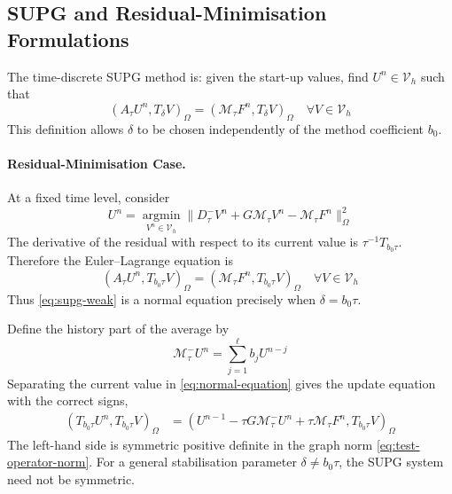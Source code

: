 \documentclass[11pt]{article}
\begin{document}

\subsection{SUPG and Residual-Minimisation Formulations}
\label{subsec:supg-residual-formulations}
The time-discrete SUPG method is: given the start-up values, find
\(U^n\in\mathcal V_h\) such that
\begin{equation}
(A_{\tau}U^n,T_{\delta}V)_{\Omega}
=(\mathcal M_{\tau}F^n,T_{\delta}V)_{\Omega}
\quad \forall V\in\mathcal V_h \label{eq:supg-weak}
\end{equation}
This definition allows \(\delta\) to be chosen independently of the method
coefficient \(b_0\).

\paragraph{Residual-Minimisation Case.}
At a fixed time level, consider
\begin{equation}
U^n=\operatorname*{argmin}_{V^n\in\mathcal V_h}
\|D_{\tau}^{-}V^n+G\mathcal M_{\tau}V^n
-\mathcal M_{\tau}F^n\|_{\Omega}^2 \label{eq:ls}
\end{equation}
The derivative of the residual with respect to its current value is
\(\tau^{-1}T_{b_0\tau}\). Therefore the Euler--Lagrange equation is
\begin{equation}
(A_{\tau}U^n,T_{b_0\tau}V)_{\Omega}
=(\mathcal M_{\tau}F^n,T_{b_0\tau}V)_{\Omega}
\quad \forall V\in\mathcal V_h \label{eq:normal-equation}
\end{equation}
Thus \eqref{eq:supg-weak} is a normal equation precisely when
\(\delta=b_0\tau\).

Define the history part of the average by
\begin{equation}
\mathcal M_{\tau}^{-}U^n=\sum_{j=1}^{\ell}b_jU^{n-j} \label{eq:history-average}
\end{equation}
Separating the current value in \eqref{eq:normal-equation} gives the update
equation with the correct signs,
\begin{align}
(T_{b_0\tau}U^n,T_{b_0\tau}V)_{\Omega}
&=(U^{n-1}-\tau G\mathcal M_{\tau}^{-}U^n
+\tau\mathcal M_{\tau}F^n,T_{b_0\tau}V)_{\Omega} \label{eq:normal-update-equation}
\end{align}
The left-hand side is symmetric positive definite in the graph norm
\eqref{eq:test-operator-norm}. For a general stabilisation parameter
\(\delta\ne b_0\tau\), the SUPG system need not be symmetric.
\end{document}

